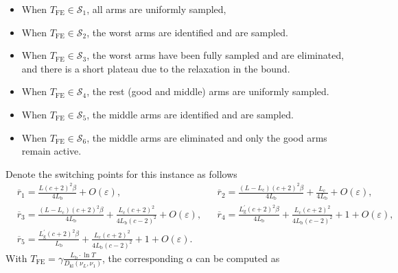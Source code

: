 \documentclass[twoside,11pt]{article}
\newcommand{\kl}{D_{\mathrm{kl}}}
\newcommand{\rmb}{\mathrm{b}}
\newcommand{\rmc}{\mathrm{c}}
\newcommand{\rmg}{\mathrm{g}}
\newcommand{\Tfe}{T_{\mathrm{FE}}}
\begin{document}
\begin{itemize}[leftmargin=2em,topsep=1pt]
    \item  When $\Tfe\in\mathcal{S}_1$, all arms are uniformly sampled,
    \item  When $\Tfe\in\mathcal{S}_2$, the worst arms are identified and are sampled.
    \item  When $\Tfe\in\mathcal{S}_3$, the worst arms have been fully sampled and are eliminated, and there is a short plateau due to the relaxation in the bound.
    \item  When $\Tfe\in\mathcal{S}_4$, the rest (good and middle) arms are uniformly sampled.
    \item  When $\Tfe\in\mathcal{S}_5$, the middle arms are identified and are sampled.
    \item  When $\Tfe\in\mathcal{S}_6$, the middle arms are eliminated and only the good arms remain active.
\end{itemize}
Denote the switching points for this instance as follows
\begin{align}
    &\overline{r}_1 \!=\! \frac{L(c+2)^2\beta}{4L_{\rmb}}+O(\varepsilon)
    ,
    &&\overline{r}_2 \!= \!\frac{(L-L_{\rmc})(c+2)^2\beta}{4L_{\rmb}}+\frac{L_{\rmc}}{4L_{\rmb}}+O(\varepsilon)
    ,
    \\
    &
    \overline{r}_3\! =\! \frac{(L-L_{\rmc})(c+2)^2\beta}{4L_{\rmb}}+\frac{L_{\rmc}(c+2)^2}{4L_{\rmb}(c-2)^2}+O(\varepsilon)
    ,
    &&\overline{r}_4\! =\! \frac{L_{\rmg}^\prime (c+2)^2\beta}{4L_{\rmb}}+\frac{L_{\rmc}(c+2)^2}{4L_{\rmb}(c-2)^2} + 1+O(\varepsilon),
    \\
    &\overline{r}_5\! =\! \frac{L_{\rmg}^\prime(c+2)^2\beta}{L_{\rmb}}+ \frac{L_{\rmc}(c+2)^2}{4L_{\rmb}(c-2)^2} + 1+O(\varepsilon) .
\end{align}
With $\Tfe = \gamma \frac{L_{\rmb}\cdot \ln T}{\kl(\nu_L,\nu_1)}$,
the corresponding $\alpha$ can be computed as
\end{document}

